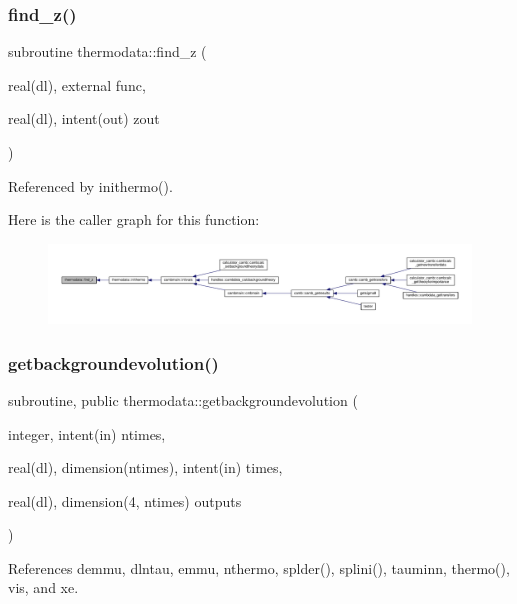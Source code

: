 \subsubsection{\texorpdfstring{find\+\_\+z()}{find\_z()}}
{\footnotesize\ttfamily subroutine thermodata\+::find\+\_\+z (\begin{DoxyParamCaption}\item[{real(dl), external}]{func,  }\item[{real(dl), intent(out)}]{zout }\end{DoxyParamCaption})\hspace{0.3cm}{\ttfamily [private]}}



Referenced by inithermo().

Here is the caller graph for this function\+:
\nopagebreak
\begin{figure}[H]
\begin{center}
\leavevmode
\includegraphics[width=350pt]{namespacethermodata_a402bcd30314032d575f841bf374ad320_icgraph}
\end{center}
\end{figure}
\mbox{\label{namespacethermodata_a94d40d05e68eca4db87b58269d19e6f3}} 
\subsubsection{\texorpdfstring{getbackgroundevolution()}{getbackgroundevolution()}}
{\footnotesize\ttfamily subroutine, public thermodata\+::getbackgroundevolution (\begin{DoxyParamCaption}\item[{integer, intent(in)}]{ntimes,  }\item[{real(dl), dimension(ntimes), intent(in)}]{times,  }\item[{real(dl), dimension(4, ntimes)}]{outputs }\end{DoxyParamCaption})}



References demmu, dlntau, emmu, nthermo, splder(), splini(), tauminn, thermo(), vis, and xe.

